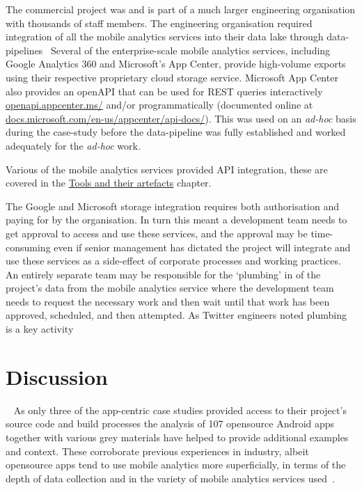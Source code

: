 The commercial project was and is part of a much larger engineering organisation with thousands of staff members. The engineering organisation required integration of all the mobile analytics services into their data lake through data-pipelines~ Several of the enterprise-scale mobile analytics services, including Google Analytics 360 and Microsoft's App Center, provide high-volume exports using their respective proprietary cloud storage service. Microsoft App Center also provides an openAPI that can be used for REST queries interactively \href{https://openapi.appcenter.ms/}{openapi.appcenter.ms/} and/or programmatically (documented online at \href{https://docs.microsoft.com/en-us/appcenter/api-docs/}{docs.microsoft.com/en-us/appcenter/api-docs/}). This was used on an \emph{ad-hoc} basis during the case-study before the data-pipeline was fully established and worked adequately for the \emph{ad-hoc} work.  

Various of the mobile analytics services provided API integration, these are covered in the \href{chapter-tools-and-their-artefacts}{Tools and their artefacts} chapter.

The Google and Microsoft storage integration requires both authorisation and paying for by the organisation. In turn this meant a development team needs to get approval to access and use these services, and the approval may be time-consuming even if senior management has dictated the project will integrate and use these services as a side-effect of corporate processes and working practices. An entirely separate team may be responsible for the `plumbing' in of the project's data from the mobile analytics service where the development team needs to request the necessary work and then wait until that work has been approved, scheduled, and then attempted. As Twitter engineers noted plumbing is a key activity~ 


\section{Discussion}~\label{aata-discussion-section}
As only three of the app-centric case studies provided access to their project's source code and build processes the analysis of 107 opensource Android apps together with various grey materials have helped to provide additional examples and context. These corroborate previous experiences in industry, albeit opensource apps tend to use mobile analytics more superficially, in terms of the depth of data collection and in the variety of mobile analytics services used~.

